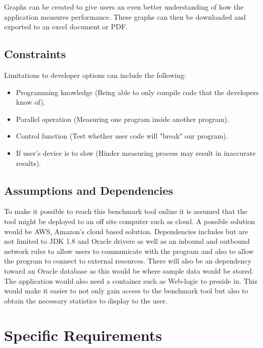 \documentclass[a4paper,12pt]{article}
\begin{document}
Graphs can be created to give users an even better understanding of how the application measures performance. These graphs can then be downloaded and exported to an excel document or PDF. 

\subsection{Constraints}
Limitations to developer options can include the following:
\begin{itemize}
\item Programming knowledge (Being able to only compile code that the developers know of).
\item Parallel operation (Measuring one program inside another program).
\item Control function (Test whether user code will "break" our program).
\item If user's device is to slow (Hinder measuring process may result in inaccurate results).
\end{itemize}

\subsection{Assumptions and Dependencies}
To make it possible to reach this benchmark tool online it is assumed that the tool might be deployed to an off site computer such as cloud. A possible solution would be AWS, Amazon's cloud based solution. Dependencies includes but are not limited to JDK 1.8 and Oracle drivers as well as an inbound and outbound network rules to allow users to communicate with the program and also to allow the program to connect to external resources. There will also be an dependency toward an Oracle database as this would be where sample data would be stored. The application would also need a container such as Web-logic to preside in. This would make it easier to not only gain access to the benchmark tool but also to obtain the necessary statistics to display to the user. 

\section{Specific Requirements}
\end{document}
